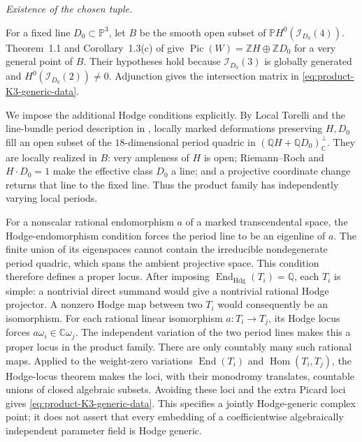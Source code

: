 \emph{Existence of the chosen tuple.}\par
For a fixed line $D_0\subset\mathbb P^3$, let $B$ be the smooth open
subset of $\mathbb P H^0(\mathcal I_{D_0}(4))$. Theorem~1.1 and
Corollary~1.3(c) of \citet[p.~2 of the opened author version]
{frBrevikNollet2011} give $\operatorname{Pic}(W)=\mathbb ZH\oplus
\mathbb ZD_0$ for a very general point of $B$. Their hypotheses hold
because $\mathcal I_{D_0}(3)$ is globally generated and
$H^0(\mathcal I_{D_0}(2))\ne0$. Adjunction gives the intersection matrix
in \eqref{eq:product-K3-generic-data}.

We impose the additional Hodge conditions explicitly. By Local Torelli
and the line-bundle period description in
\citet[Proposition~6.2.8 and Section~6.2.4, pp.~107--108 of the
opened author version]{frHuybrechtsK3Book}, locally marked deformations
preserving $H,D_0$ fill an open subset of the $18$-dimensional period
quadric in $(\mathbb QH+\mathbb QD_0)^\perp_{\mathbb C}$.
They are locally realized in $B$: very ampleness of $H$ is open;
Riemann--Roch and $H\cdot D_0=1$ make the effective class $D_0$ a line;
and a projective coordinate change returns that line to the fixed line.
Thus the product family has independently varying local periods.

For a nonscalar rational endomorphism $a$ of a marked transcendental
space, the Hodge-endomorphism condition forces the period line to be
an eigenline of $a$. The finite union of its eigenspaces cannot contain
the irreducible nondegenerate period quadric, which spans the ambient
projective space. This condition therefore defines a proper locus.
After imposing $\operatorname{End}_{\mathrm{Hdg}}(T_i)=\mathbb Q$,
each $T_i$ is simple: a nontrivial direct summand would give a
nontrivial rational Hodge projector. A nonzero Hodge map between two
$T_i$ would consequently be an isomorphism. For each rational linear
isomorphism $a:T_i\to T_j$, its Hodge locus forces
$a\omega_i\in\mathbb C\omega_j$. The independent variation of the
two period lines makes this a proper locus in the product family.
There are only countably many such rational maps. Applied to the
weight-zero variations $\operatorname{End}(T_i)$ and
$\operatorname{Hom}(T_i,T_j)$, the Hodge-locus theorem
\citep[Theorem~1.1 and Corollary~1.3, p.~2]{frCDK1994}
makes the loci, with their monodromy translates, countable unions of
closed algebraic subsets. Avoiding these loci and the extra Picard
loci gives \eqref{eq:product-K3-generic-data}. This specifies a jointly
Hodge-generic complex point; it does not assert that every embedding
of a coefficientwise algebraically independent parameter field is
Hodge generic.

